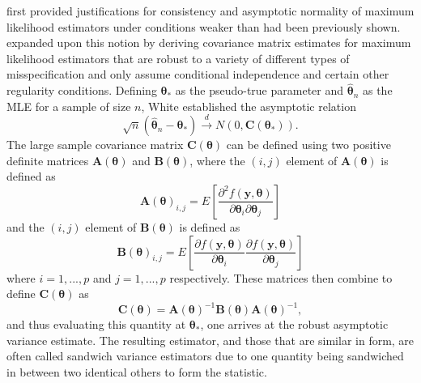 \documentclass[submit]{smj}
\begin{document}
		\citet{Huber} first provided justifications for consistency and asymptotic normality of maximum likelihood estimators under conditions weaker than had been previously shown. \citet{White1982}
		expanded upon this notion by deriving covariance matrix estimates for maximum likelihood estimators that are robust to a variety of different types of misspecification and only assume
		conditional independence and certain other regularity conditions. Defining $\bm{\theta}_*$ as the pseudo-true parameter and $\hat{\bm{\theta}}_n$ as the MLE for a sample of size
		$n$, White established the asymptotic relation
		\begin{equation*}
			\sqrt{n} (\hat{\bm{\theta}}_n - \bm{\theta}_*) \xrightarrow[]{d} N(0, \bm{C}(\bm{\theta}_* ) ) .
		\end{equation*}
		The large sample covariance matrix $\bm{C}(\bm{\theta})$ can be defined using two positive definite matrices $\bm{A}(\bm{\theta})$ and $\bm{B}(\bm{\theta})$, where the $(i,j)$ element of $\bm{A}(\bm{\theta})$ is defined as
		\begin{equation*}
			\bm{A}(\bm{\theta})_{i,j} = E \left[ \frac{\partial^2 f(\bm{y},\bm{\theta})}{\partial \bm{\theta}_i \partial \bm{\theta}_j} \right] 
		\end{equation*}
		and the $(i,j)$ element of $\bm{B}(\bm{\theta})$ is defined as
		\begin{equation*}
			\bm{B}(\bm{\theta})_{i,j} = E \left[ \frac{\partial f(\bm{y},\bm{\theta})}{\partial \bm{\theta}_i} \frac{\partial f(\bm{y},\bm{\theta})}{\partial \bm{\theta}_j} \right] 
		\end{equation*}
		where $i = 1,...,p$ and $j = 1,...,p$ respectively. These matrices then combine to define $\bm{C}(\bm{\theta})$ as
		\begin{equation*}
			\bm{C}(\bm{\theta}) = \bm{A}(\bm{\theta})^{-1} \bm{B}(\bm{\theta}) \bm{A}(\bm{\theta})^{-1} ,
		\end{equation*}
		and thus evaluating this quantity at $\bm{\theta}_*$, one arrives at the robust asymptotic variance estimate. The resulting estimator, and those that are similar in form, are often called sandwich
		variance estimators due to one quantity being sandwiched in between two identical others to form the statistic.
\end{document}

